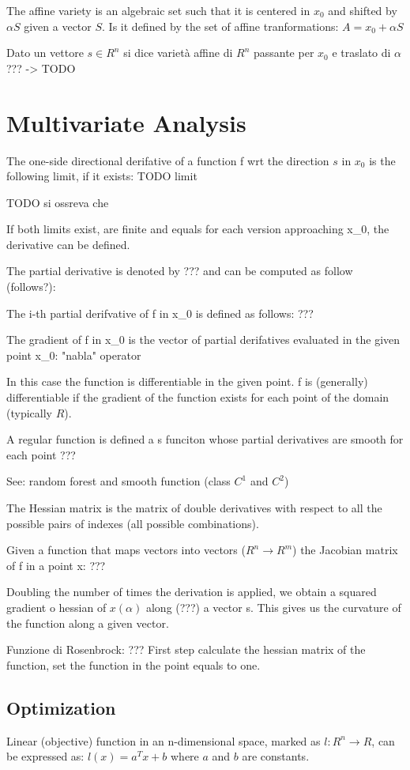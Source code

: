 The affine variety is an algebraic set such that it is centered in $x_0$ and shifted by $\alpha S$ given a vector $S$. Is it defined by the set of affine tranformations:
$A = x_0 + \alpha S$

Dato un vettore $s \in R^n$ si dice varietà affine di $R^n$ passante per $x_0$ e traslato di $\alpha$ ??? -> TODO

\section{Multivariate Analysis}
The one-side directional derifative of a function f wrt the direction $s$ in $x_0$ is the following limit, if it exists: TODO limit

TODO si ossreva che 


If both limits exist, are finite and equals for each version approaching x_0, the derivative can be defined.

The partial derivative is denoted by ??? and can be computed as follow (follows?): 

The i-th partial derifvative of f in x_0 is defined as follows: ???

The gradient of f in x_0 is the vector of partial derifatives evaluated in the given point x_0: "nabla" operator

In this case the function is differentiable in the given point.
f is (generally) differentiable if the gradient of the function exists for each point of the domain (typically $R$).

A regular function is defined a s funciton whose partial derivatives are smooth for each point ???

See: random forest and smooth function (class $C^1$ and $C^2$)

The Hessian matrix is the matrix of double derivatives with respect to all the possible pairs of indexes (all possible combinations).

Given a function that maps vectors into vectors ($R^n \rightarrow R^m$) the Jacobian matrix of f in a point x: ???

Doubling the number of times the derivation is applied, we obtain a squared gradient o hessian of $x(\alpha)$ along (???) a vector s.
This gives us the curvature of the function along a given vector.

Funzione di Rosenbrock: ???
First step calculate the hessian matrix of the function, set the function in the point equals to one.

\subsection{Optimization}
Linear (objective) function in an n-dimensional space, marked as $l: R^n \rightarrow R$, can be expressed as:
$l(x) = a^T x + b$ where $a$ and $b$ are constants.

